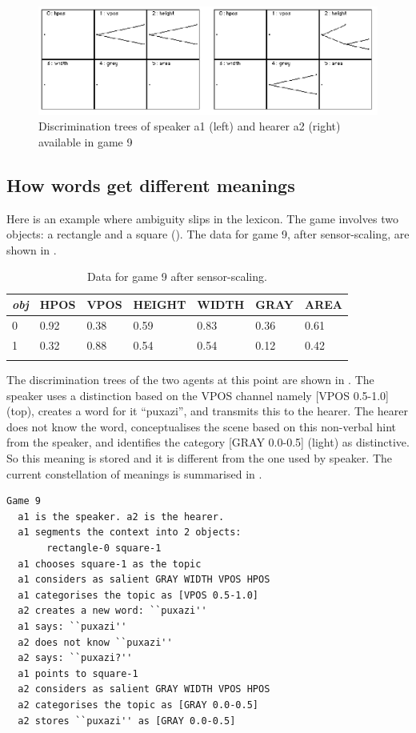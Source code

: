 \begin{figure}[htbp]
  \centerline{\includegraphics[width=.80\textwidth]{chap6/figs/discri-game9}}
\caption{\label{discri-game9} Discrimination trees
of speaker a1 (left) and hearer a2 (right) available 
in game 9}
\end{figure}

\subsection{How words get different meanings}

Here is an example where ambiguity slips in 
the lexicon. The game involves two 
objects: a rectangle and a square (). 
The data for game 9, after sensor-scaling, are
shown in .  


\begin{table}
\begin{center}
\begin{tabular}{ l  l  l  l  l  l  l }
\lsptoprule
{\itshape obj} & HPOS & VPOS & HEIGHT & WIDTH & GRAY & AREA \\ \midrule
0 & 0.92 & 0.38 & 0.59 & 0.83 & 0.36 & 0.61\\ 
1 & 0.32 & 0.88 & 0.54 & 0.54 & 0.12 & 0.42\\ 
\lspbottomrule
\end{tabular}
\caption{\label{tab:different} Data for game 9 after sensor-scaling.}
\end{center}
\end{table}
The discrimination trees of the two agents at this point
are shown in . 
The speaker uses a distinction based on the 
VPOS channel namely [VPOS 0.5-1.0] (top), creates
a word for it ``puxazi'', and transmits this to the hearer. 
The hearer does not know the word,
conceptualises the scene based on this non-verbal
hint from the speaker, and identifies the category
{}[GRAY 0.0-0.5] (light) as distinctive. So this 
meaning is stored and it is different from the one used by 
speaker. The current constellation of meanings
is summarised in . 
\begin{verbatim}
Game 9
  a1 is the speaker. a2 is the hearer. 
  a1 segments the context into 2 objects: 
       rectangle-0 square-1 
  a1 chooses square-1 as the topic 
  a1 considers as salient GRAY WIDTH VPOS HPOS 
  a1 categorises the topic as [VPOS 0.5-1.0]
  a2 creates a new word: ``puxazi''
  a1 says: ``puxazi''
  a2 does not know ``puxazi''
  a2 says: ``puxazi?''
  a1 points to square-1
  a2 considers as salient GRAY WIDTH VPOS HPOS 
  a2 categorises the topic as [GRAY 0.0-0.5]
  a2 stores ``puxazi'' as [GRAY 0.0-0.5]
\end{verbatim}


